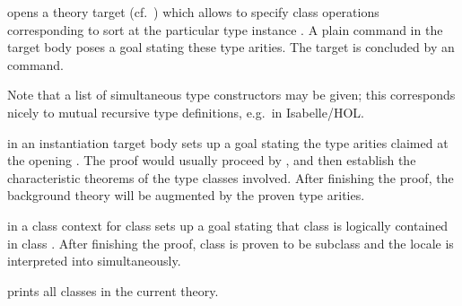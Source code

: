 \begin{isabellebody}
\begin{isamarkuptext}
\begin{descr}
  \item [\hyperlink{command.instantiation}{\mbox{\isa{\isacommand{instantiation}}}}~\isa{{\isachardoublequote}t\ {\isacharcolon}{\isacharcolon}\ {\isacharparenleft}s\isactrlsub {\isadigit{1}}{\isacharcomma}\ {\isasymdots}{\isacharcomma}\ s\isactrlsub n{\isacharparenright}\ s\ {\isasymBEGIN}{\isachardoublequote}}] opens a theory target (cf.\
  ) which allows to specify class operations  corresponding to sort  at the
  particular type instance .  A plain \hyperlink{command.instance}{\mbox{}} command
  in the target body poses a goal stating these type arities.  The
  target is concluded by an \indexref{}{command}{end}\hyperlink{command.end}{\mbox{}} command.

  Note that a list of simultaneous type constructors may be given;
  this corresponds nicely to mutual recursive type definitions, e.g.\
  in Isabelle/HOL.

  \item [\hyperlink{command.instance}{\mbox{\isa{\isacommand{instance}}}}] in an instantiation target body sets
  up a goal stating the type arities claimed at the opening \hyperlink{command.instantiation}{\mbox{}}.  The proof would usually proceed by \hyperlink{method.intro_classes}{\mbox{}}, and then establish the characteristic theorems of
  the type classes involved.  After finishing the proof, the
  background theory will be augmented by the proven type arities.

  \item [\hyperlink{command.subclass}{\mbox{\isa{\isacommand{subclass}}}}~\isa{c}] in a class context for class
   sets up a goal stating that class  is logically
  contained in class .  After finishing the proof, class
  \isa{d} is proven to be subclass \isa{c} and the locale \isa{c} is interpreted into \isa{d} simultaneously.

  \item [\hyperlink{command.print_classes}{\mbox{\isa{\isacommand{print{\isacharunderscore}classes}}}}] prints all classes in the current
  theory.


\end{descr}
\end{isamarkuptext}
\end{isabellebody}
